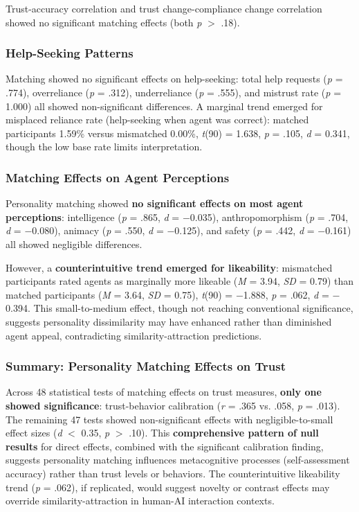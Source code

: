 \documentclass[12pt]{article}
\begin{document}
Trust-accuracy correlation and trust change-compliance change correlation showed no significant matching effects (both \textit{p} $>$ .18).

\subsubsection{Help-Seeking Patterns}

Matching showed no significant effects on help-seeking: total help requests (\textit{p} = .774), overreliance (\textit{p} = .312), underreliance (\textit{p} = .555), and mistrust rate (\textit{p} = 1.000) all showed non-significant differences. A marginal trend emerged for misplaced reliance rate (help-seeking when agent was correct): matched participants 1.59\% versus mismatched 0.00\%, \textit{t}(90) = 1.638, \textit{p} = .105, \textit{d} = 0.341, though the low base rate limits interpretation.

\subsubsection{Matching Effects on Agent Perceptions}

Personality matching showed \textbf{no significant effects on most agent perceptions}: intelligence (\textit{p} = .865, \textit{d} = $-$0.035), anthropomorphism (\textit{p} = .704, \textit{d} = $-$0.080), animacy (\textit{p} = .550, \textit{d} = $-$0.125), and safety (\textit{p} = .442, \textit{d} = $-$0.161) all showed negligible differences.

However, a \textbf{counterintuitive trend emerged for likeability}: mismatched participants rated agents as marginally more likeable (\textit{M} = 3.94, \textit{SD} = 0.79) than matched participants (\textit{M} = 3.64, \textit{SD} = 0.75), \textit{t}(90) = $-$1.888, \textit{p} = .062, \textit{d} = $-$0.394. This small-to-medium effect, though not reaching conventional significance, suggests personality dissimilarity may have enhanced rather than diminished agent appeal, contradicting similarity-attraction predictions.

\subsubsection{Summary: Personality Matching Effects on Trust}

Across 48 statistical tests of matching effects on trust measures, \textbf{only one showed significance}: trust-behavior calibration (\textit{r} = .365 vs. .058, \textit{p} = .013). The remaining 47 tests showed non-significant effects with negligible-to-small effect sizes (\textit{d} $<$ 0.35, \textit{p} $>$ .10). This \textbf{comprehensive pattern of null results} for direct effects, combined with the significant calibration finding, suggests personality matching influences metacognitive processes (self-assessment accuracy) rather than trust levels or behaviors. The counterintuitive likeability trend (\textit{p} = .062), if replicated, would suggest novelty or contrast effects may override similarity-attraction in human-AI interaction contexts.
\end{document}

